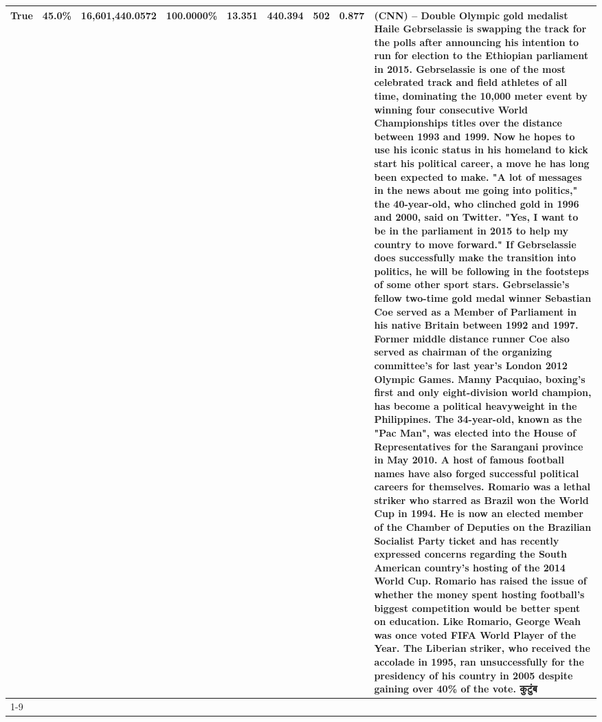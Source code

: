 \begin{table}[H]
{\begin{tabular}{lllrlllll}
True & 45.0\% & 16,601,440.0572 & \bfseries \color{red} 100.0000\% & 13.351 & 440.394 & 502 & 0.877 & (CNN) -- Double Olympic gold medalist Haile Gebrselassie is swapping the track for the polls after announcing his intention to run for election to the Ethiopian parliament in 2015. Gebrselassie is one of the most celebrated track and field athletes of all time, dominating the 10,000 meter event by winning four consecutive World Championships titles over the distance between 1993 and 1999. Now he hopes to use his iconic status in his homeland to kick start his political career, a move he has long been expected to make. "A lot of messages in the news about me going into politics," the 40-year-old, who clinched gold in 1996 and 2000, said on Twitter. "Yes, I want to be in the parliament in 2015 to help my country to move forward." If Gebrselassie does successfully make the transition into politics, he will be following in the footsteps of some other sport stars. Gebrselassie's fellow two-time gold medal winner Sebastian Coe served as a Member of Parliament in his native Britain between 1992 and 1997. Former middle distance runner Coe also served as chairman of the organizing committee's for last year's London 2012 Olympic Games. Manny Pacquiao, boxing's first and only eight-division world champion, has become a political heavyweight in the Philippines. The 34-year-old, known as the "Pac Man", was elected into the House of Representatives for the Sarangani province in May 2010. A host of famous football names have also forged successful political careers for themselves. Romario was a lethal striker who starred as Brazil won the World Cup in 1994. He is now an elected member of the Chamber of Deputies on the Brazilian Socialist Party ticket and has recently expressed concerns regarding the South American country's hosting of the 2014 World Cup. Romario has raised the issue of whether the money spent hosting football's biggest competition would be better spent on education. Like Romario, George Weah was once voted FIFA World Player of the Year. The Liberian striker, who received the accolade in 1995, ran unsuccessfully for the presidency of his country in 2005 despite gaining over 40\% of the vote. कुटुंब \\
\cline{1-9}

\end{tabular}}
\end{table}
